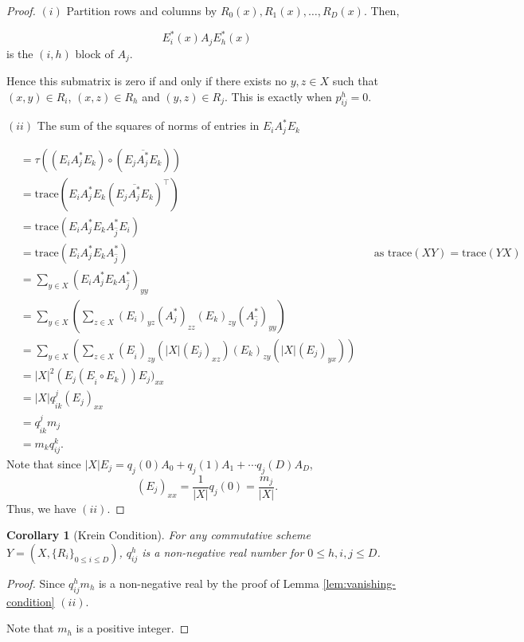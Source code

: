 \documentclass[
]{book}
\newtheorem{corollary}{Corollary}[chapter]
\theoremstyle{definition}
\theoremstyle{definition}
\theoremstyle{definition}
\theoremstyle{definition}
\theoremstyle{remark}
\begin{document}
\begin{proof}
\leavevmode

\((i)\) Partition rows and columns by \(R_0(x), R_1(x), \ldots, R_D(x)\). Then,

\[E^*_i(x)A_j E^*_h(x)\]
is the \((i,h)\) block of \(A_j\).

Hence this submatrix is zero if and only if there exists no \(y,z\in X\) such that \((x,y)\in R_i\), \((x,z)\in R_h\) and \((y,z)\in R_j\). This is exactly when \(p^h_{ij} = 0\).

\((ii)\) The sum of the squares of norms of entries in \(E_iA^*_jE_k\)

\begin{align}
& = \tau((E_iA^*_jE_k)\circ (\overline{E_jA^*_jE_k}))\\
& = \mathrm{trace}(E_iA^*_jE_k(\overline{E_jA^*_jE_k})^\top)\\
& = \mathrm{trace}(E_iA^*_jE_kA^*_{\hat{j}}E_i)\\
& = \mathrm{trace}(E_iA^*_jE_kA^*_{\hat{j}}) && \text{as $\mathrm{trace}(XY) = \mathrm{trace}(YX)$}\\
& = \sum_{y\in X}(E_iA^*_jE_kA^*_{\hat{j}})_{yy}\\
& = \sum_{y\in X}\left(\sum_{z\in X} (E_i)_{yz}(A^*_j)_{zz}(E_k)_{zy}(A^*_{\hat{j}})_{yy}\right)\\
& = \sum_{y\in X}\left(\sum_{z\in X} (E_{\hat{i}})_{zy}(|X|(E_j)_{xz})(E_k)_{zy}(|X|(E_j)_{yx})\right)\\
& = |X|^2(E_j(E_{\hat{i}}\circ E_k))E_j)_{xx}\\
& = |X|q^j_{\hat{i}k}(E_j)_{xx}\\
& = q^j_{\hat{i}k}m_j \\
& = m_kq^k_{ij}.
\end{align}
Note that since \(|X|E_j = q_j(0)A_0 + q_j(1)A_1 + \cdots q_j(D)A_D\),
\[(E_j)_{xx} = \frac{1}{|X|}q_j(0) = \frac{m_j}{|X|}.\]
Thus, we have \((ii)\).

\end{proof}

\begin{corollary}[Krein Condition]
\protect\hypertarget{cor:qhij}{}\label{cor:qhij}For any commutative scheme \(Y = (X, \{R_i\}_{0\leq i\leq D})\), \(q^h_{ij}\) is a non-negative real number for \(0\leq h, i, j\leq D\).
\end{corollary}

\begin{proof}
Since \(q^h_{ij}m_h\) is a non-negative real by the proof of Lemma \ref{lem:vanishing-condition} \((ii)\).

Note that \(m_h\) is a positive integer.
\end{proof}
\end{document}
